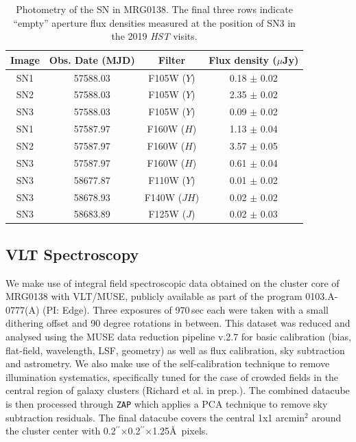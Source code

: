 \documentclass[12pt]{article}
\gdef\arcsec{$^{\prime\prime}$}
\begin{document}
\begin{table}[ht]
\centering
\begin{tabular}{cccc}
Image & Obs. Date (MJD) & Filter & Flux density ($\mu$Jy) \\
\midrule
SN1 & 57588.03 & F105W ($Y$) & 0.18  $\pm$ 0.02 \\
SN2 & 57588.03 & F105W ($Y$) & 2.35  $\pm$ 0.02 \\
SN3 & 57588.03 & F105W ($Y$) & 0.09  $\pm$ 0.02 \\
SN1 & 57587.97 & F160W ($H$) & 1.13  $\pm$ 0.04 \\
SN2 & 57587.97 & F160W ($H$) & 3.57  $\pm$ 0.05 \\
SN3 & 57587.97 & F160W ($H$) & 0.61  $\pm$ 0.04 \\
\midrule
SN3 & 58677.87 & F110W ($Y$) & 0.01  $\pm$ 0.02 \\
SN3 & 58678.93 & F140W ($JH$) & 0.02  $\pm$ 0.02 \\
SN3 & 58683.89 & F125W ($J$) & 0.02  $\pm$ 0.03 \\
\end{tabular}
\caption{Photometry of the SN in MRG0138.  The final three rows indicate ``empty'' aperture flux densities measured at the position of SN3 in the 2019 \textit{HST} visits.
\label{tab:photometry}}
\end{table}


\subsection*{VLT Spectroscopy}
\label{sec:vltmuse}

We make use of integral field spectroscopic data obtained on the cluster core of MRG0138 with VLT/MUSE, publicly 
available as part of the program 0103.A-0777(A) (PI: Edge). Three exposures of 970\,sec each were taken with a small dithering offset and 90 degree rotations in between. This dataset was reduced and analysed using the MUSE data reduction pipeline v.2.7 \cite{weilbacher_data_2020} for basic calibration (bias, flat-field, wavelength, LSF, geometry) as well as flux calibration, sky subtraction and astrometry.  We  also make use of the self-calibration technique \cite{bacon_muse_2017} to remove illumination systematics, specifically tuned for the case of crowded fields in the central region of galaxy clusters (Richard et al. in prep.). The combined datacube is then processed through {\tt ZAP} \cite{soto_zap_2016} which applies a PCA technique to remove sky subtraction residuals. The final datacube covers the central 1x1 arcmin$^2$ around the cluster center with 0.2\arcsec$\times$0.2\arcsec$\times$1.25\AA\ pixels.
\end{document}
